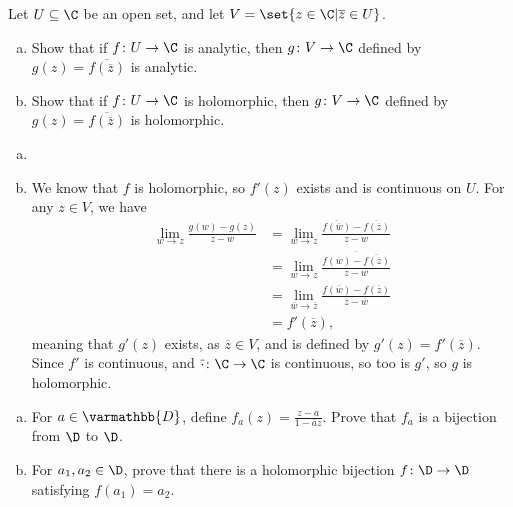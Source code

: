 \documentclass[10pt]{mypackage}
\renewcommand*{\mathbb}[1]{\varmathbb{#1}}
\begin{document}
\begin{problem}[Problem 5]
  Let $U\subseteq \C$ be an open set, and let $V = \set{z\in \C | \overline{z}\in U}$.
  \begin{enumerate}[(a)]
    \item Show that if $f\colon U\rightarrow \C$ is analytic, then $g\colon V\rightarrow \C$ defined by $g(z) = \overline{f\left( \overline{z} \right)}$ is analytic.
    \item Show that if $f\colon U\rightarrow \C$ is holomorphic, then $g\colon V\rightarrow \C$ defined by $g\left( z \right) = \overline{f\left( \overline{z} \right)}$ is holomorphic.
  \end{enumerate}
\end{problem}
\begin{solution}\hfill
  \begin{enumerate}[(a)]
    \item 
    \item We know that $f$ is holomorphic, so $f'(z)$ exists and is continuous on $U$. For any $z\in V$, we have
      \begin{align*}
        \lim_{w\rightarrow z} \frac{g\left( w \right) - g\left( z \right)}{z-w} &= \lim_{w\rightarrow z} \frac{ \overline{f\left( \overline{w} \right)} - \overline{f\left( \overline{z} \right)} }{ z-w }\\
                                                                                &= \lim_{w\rightarrow z} \frac{ \overline{ f\left( \overline{w} \right) - \overline{f\left( \overline{z} \right)} } }{z-w}\\
                                                                                &= \lim_{ \overline{w}\rightarrow \overline{z} } \frac{f\left( \overline{w} \right) - f\left( \overline{z} \right)}{ \overline{z} - \overline{w} }\\
                                                                                &= f'\left( \overline{z} \right),
      \end{align*}
      meaning that $g'(z)$ exists, as $ \overline{z}\in V $, and is defined by $g'(z) = f'\left( \overline{z} \right)$. Since $f'$ is continuous, and $ \overline{\cdot}\colon \C\rightarrow \C $ is continuous, so too is $g'$, so $g$ is holomorphic.
  \end{enumerate}
\end{solution}
\begin{problem}[Problem 6]\hfill
  \begin{enumerate}[(a)]
    \item For $a\in \mathbb{D}$, define $f_a(z) = \frac{z-a}{1- \overline{a}z}$. Prove that $f_a$ is a bijection from $\D$ to $\D$.
    \item For $a_1,a_2\in \D$, prove that there is a holomorphic bijection $f\colon \D\rightarrow \D$ satisfying $f\left( a_1 \right) = a_2$.
  \end{enumerate}
\end{problem}
\end{document}
